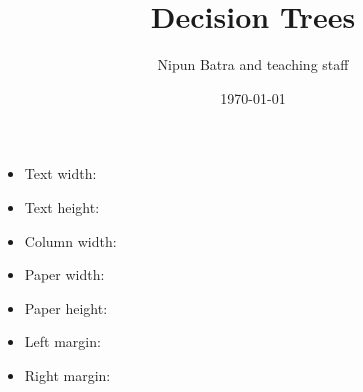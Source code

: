 \documentclass[usenames,dvipsnames]{beamer}
\title{Decision Trees}
\date{\today}
\author{Nipun Batra and teaching staff}
\institute{IIT Gandhinagar}
\begin{document}
	\maketitle

    \begin{frame}
        
        \begin{itemize}
            \item Text width: \the\textwidth
            \item Text height: \the\textheight
            \item Column width: \the\columnwidth
            \item Paper width: \the\paperwidth
            \item Paper height: \the\paperheight
            \item Left margin: \the\oddsidemargin
            \item Right margin: \the\evensidemargin
        
          \end{itemize}

\end{frame}
\end{document}
